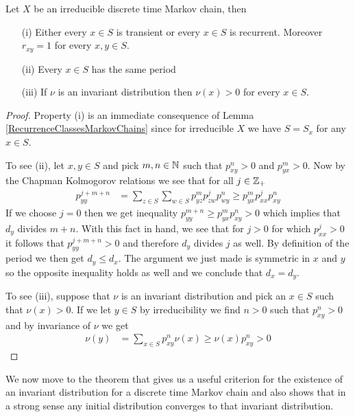 \begin{prop}\label{IrreducibleChainProperties}Let $X$ be an irreducible discrete time Markov chain, then 
\begin{itemize}
\item[(i)]Either every $x \in S$ is transient or every $x \in S$ is
  recurrent.  Moreover $r_{xy} = 1$ for every $x,y \in S$.
\item[(ii)]Every $x \in S$ has the same period
\item[(iii)]If $\nu$ is an invariant distribution then $\nu(x) > 0$
  for every $x \in S$.
\end{itemize}
\end{prop}
\begin{proof}
Property (i) is an immediate consequence of Lemma
\ref{RecurrenceClassesMarkovChains} since for irreducible $X$ we have $S = S_x$ for any $x \in S$.

To see (ii), let $x,y \in S$ and pick $m,n \in \mathbb{N}$ such that
$p^n_{xy} > 0$ and $p^m_{yx} > 0$.  Now by the Chapman Kolmogorov
relations we see that for all $j \in \mathbb{Z}_+$
\begin{align*}
p^{j+m+n}_{yy} &= \sum_{z \in S} \sum_{w \in S} p^m_{yz} p^j_{zw}
p^n_{wy} \geq 
p^m_{yx} p^j_{xx} p^n_{xy} 
\end{align*}
If we choose $j = 0$ then we get inequality $p^{m+n}_{yy} \geq p^m_{yx} p^n_{xy} > 0$ which
implies that $d_y$ divides $m+n$.  With this fact in hand, we see that
for $j > 0$ for which $p^j_{xx} > 0$ it follows that $p^{j+m+n}_{yy} >
0$ and therefore $d_y$ divides $j$ as well.  By definition of the
period we then get $d_y \leq d_x$.  The argument we just made is
symmetric in $x$ and $y$ so the opposite inequality holds as well and
we conclude that $d_x = d_y$.

To see (iii), suppose that $\nu$ is an invariant distribution and
pick an $x \in S$ such that $\nu(x) > 0$.  If we let $y \in S$ by
irreducibility we find $n > 0$ such that $p^n_{xy} > 0$ and by
invariance of $\nu$ we get
\begin{align*}
\nu(y) &= \sum_{x \in S} p^n_{xy} \nu(x) \geq \nu(x) p^n_{xy} > 0
\end{align*}
\end{proof}

We now move to the theorem that gives us a useful criterion for the
existence of an invariant distribution for a discrete time Markov
chain and also shows that in a strong sense any initial distribution
converges to that invariant distribution.

